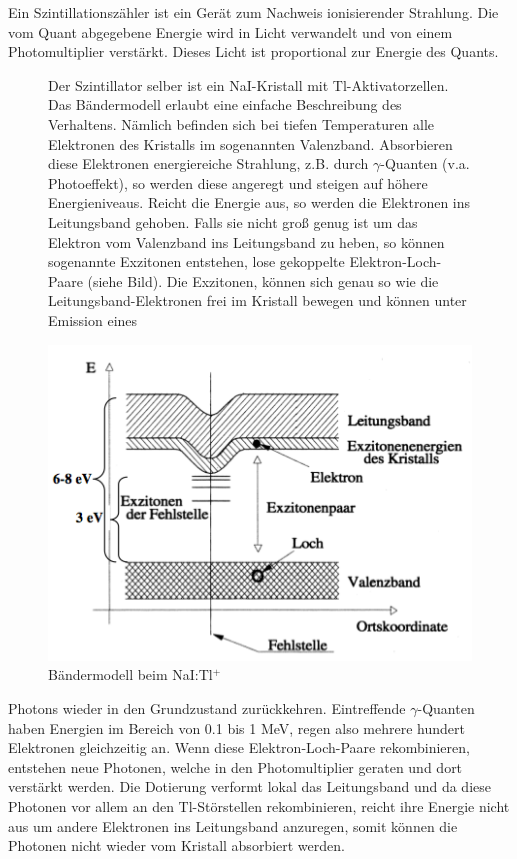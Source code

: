 Ein Szintillationszähler ist ein Gerät zum Nachweis ionisierender Strahlung. Die vom Quant abgegebene Energie wird in Licht verwandelt und von einem Photomultiplier verstärkt. Dieses Licht ist proportional zur Energie des Quants.

\begin{figure}[H]
	\begin{minipage}{0.45\textwidth}
	Der Szintillator selber ist ein NaI-Kristall mit Tl-Aktivatorzellen. Das Bändermodell erlaubt eine einfache Beschreibung des Verhaltens. Nämlich befinden sich bei tiefen Temperaturen alle Elektronen des Kristalls im sogenannten Valenzband. Absorbieren diese Elektronen energiereiche Strahlung, z.B. durch $\gamma$-Quanten (v.a. Photoeffekt), so werden diese angeregt und steigen auf höhere Energieniveaus. Reicht die Energie aus, so werden die Elektronen ins Leitungsband gehoben. Falls sie nicht groß genug ist um das Elektron vom Valenzband ins Leitungsband zu heben, so können sogenannte Exzitonen entstehen, lose gekoppelte Elektron-Loch-Paare (siehe Bild). Die Exzitonen, können sich genau so wie die Leitungsband-Elektronen frei im Kristall 
bewegen und können unter Emission eines 
	\end{minipage}
	\begin{minipage}{0.55\textwidth}
	\centering \includegraphics[width=\textwidth]{Bilder/Bandmodell.png}
	\caption{Bändermodell beim NaI:Tl$^+$}
	\end{minipage}
\end{figure}
Photons wieder in den Grundzustand zurückkehren. Eintreffende $\gamma$-Quanten haben Energien im Bereich von 0.1 bis 1 MeV, regen also mehrere hundert Elektronen gleichzeitig an. Wenn diese Elektron-Loch-Paare rekombinieren, entstehen neue Photonen, welche in den Photomultiplier geraten und dort verstärkt werden. Die Dotierung verformt lokal das Leitungsband und da diese Photonen vor allem an den Tl-Störstellen rekombinieren, reicht ihre Energie nicht aus um andere Elektronen ins Leitungsband anzuregen, somit können die Photonen nicht wieder vom Kristall absorbiert werden.





















